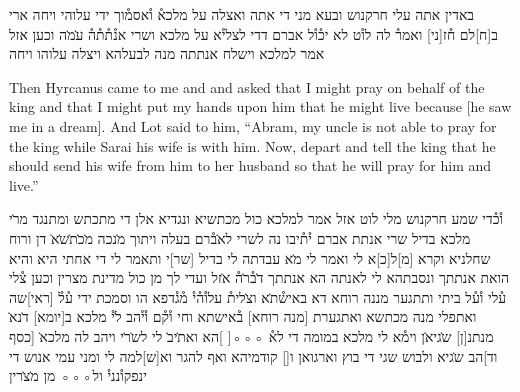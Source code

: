 \begin{aramaictext}
    באדין אתה עלי חרקנוש ובעא מני די אתה ואצלה על
    מלכא֯ ו֯אסמ֯וך ידי עלוהי ויחה ארי ב[ח]לם ח֯ז[ני] ואמר֯ לה לו֯ט לא יכ֯ו֯ל
    אברם דדי לצלי֯א על
    מלכא ושרי אנ֯ת֯ת֯ה֯ ע̇מ̇ה וכען אזל אמר למלכא וישלח אנתתה מנה לבעלהא
    ויצלה עלוהו ויחה
\end{aramaictext}

\begin{translation}
    Then Hyrcanus came to me and and asked that I might pray on behalf of
    the king and that I might put my hands upon him that he might live because [he saw me in a dream]. And Lot said to him, ``Abram, my uncle is not able to pray for
    the king while Sarai his wife is with him. Now, depart and tell the king that he should send his wife from him to her husband so that he will pray for him and live.''
\end{translation}

\begin{aramaictext}
    \vacat
    ו֯כ֯די שמע חרקנוש מלי לוט אזל אמר למלכא כול מכתשיא ונגדיא
    אלן די מתכתש ומתנגד מר̇י מלכא בדיל שרי אנתת אברם י֯ת֯יבו נה לשרי
    לא̇ב֯רם בעלה
    ויתוך מ̇נכה מ̇כ̇ת̇ש̇א̇ דן ורוח שחלניא וקרא [מ]ל[כ]א לי ואמר לי מ̇א עבדתה
    לי בדיל [שר]י ותאמר
    לי די אחתי היא והיא הואת אנתתך ונסבתהא לי לאנתה הא אנתתך ד̇ב֯ר̇ה֯
    א̇זל ועדי לך מן
    כול מדינת מצרין וכען צ֯לי ע֯לי ו֯ע֯ל ביתי ותתגער מננה רוחא דא באיש֯ת̇א
    וצ̇לית֯ עלו֯ה֯י֯ מ֯ג֯דפא
    הו וסמכת ידי ע֯ל֯ [ראי]שה ואתפלי מנה מכתשא ואתגערת [מנה רוחא]
    ב֯אישתא וחי ו֯ק֯ם ו֯י֯הב
    ל̇י֯ מלכא ב[יומא] ד̇נא̇ מנתנ[ן] ש̇גיא̇ן וימ֯א לי מלכא במומה די לא֯ ◦◦◦[  
    ]הא ואת̇יב̇ לי
    לש̇ר̇י ויהב לה מלכא̇ [כסף וד]הב ש̇גיא ולבוש שגי די בוץ וארגואן ו[\hspace{1em}]
    קודמיהא ואף להגר וא[ש]למה לי ומני עמי אנוש די ינפקו֯נני֯ ול◦◦◦ מן
    מ̇צ̇רין \vacat
\end{aramaictext}

